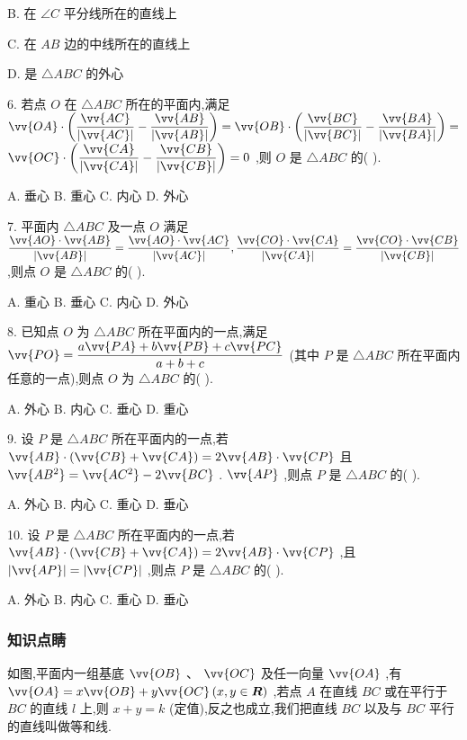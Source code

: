 B. 在 $\angle C$ 平分线所在的直线上

C. 在 ${AB}$ 边的中线所在的直线上

D. 是 $\bigtriangleup {ABC}$ 的外心

6. 若点 $O$ 在 $\bigtriangleup {ABC}$ 所在的平面内,满足 $\vv{OA} \cdot  \left( {\dfrac{\vv{AC}}{\left| \vv{AC}\right| } - \dfrac{\vv{AB}}{\left| \vv{AB}\right| }}\right)  = \vv{OB} \cdot  \left( {\dfrac{\vv{BC}}{\left| \vv{BC}\right| } - \dfrac{\vv{BA}}{\left| \vv{BA}\right| }}\right)  =$  $\vv{OC} \cdot  \left( {\dfrac{\vv{CA}}{\left| \vv{CA}\right| } - \dfrac{\vv{CB}}{\left| \vv{CB}\right| }}\right)  = 0$ ,则 $O$ 是 $\bigtriangleup  {ABC}$ 的(   ).

A. 垂心 B. 重心 C. 内心 D. 外心

7. 平面内 $\bigtriangleup {ABC}$ 及一点 $O$ 满足 $\dfrac{\vv{AO} \cdot  \vv{AB}}{\left| \vv{AB}\right| } = \dfrac{\vv{AO} \cdot  \vv{AC}}{\left| \vv{AC}\right| },\dfrac{\vv{CO} \cdot  \vv{CA}}{\left| \vv{CA}\right| } = \dfrac{\vv{CO} \cdot  \vv{CB}}{\left| \vv{CB}\right| }$ ,则点 $O$ 是 $\bigtriangleup {ABC}$ 的(   ).

A. 重心 B. 垂心 C. 内心 D. 外心

8. 已知点 $O$ 为 $\bigtriangleup {ABC}$ 所在平面内的一点,满足 $\vv{PO} = \dfrac{a\vv{PA} + b\vv{PB} + c\vv{PC}}{a + b + c}$ (其中 $P$ 是 $\bigtriangleup {ABC}$ 所在平面内任意的一点),则点 $O$ 为 $\bigtriangleup  {ABC}$ 的(   ).

A. 外心 B. 内心 C. 垂心 D. 重心

9. 设 $P$ 是 $\bigtriangleup {ABC}$ 所在平面内的一点,若 $\vv{AB} \cdot  \left( {\vv{CB} + \vv{CA}}\right)  = 2\vv{AB} \cdot  \vv{CP}$ 且 $\vv{A{B}^{2}} = \vv{A{C}^{2}} - 2\vv{BC}$ . $\vv{AP}$ ,则点 $P$ 是 $\bigtriangleup  {ABC}$ 的(   ).

A. 外心 B. 内心 C. 重心 D. 垂心

10. 设 $P$ 是 $\bigtriangleup {ABC}$ 所在平面内的一点,若 $\vv{AB} \cdot  \left( {\vv{CB} + \vv{CA}}\right)  = 2\vv{AB} \cdot  \vv{CP}$ ,且 $\left| \vv{AP}\right|  = \left| \vv{CP}\right|$ ,则点 $P$ 是 $\bigtriangleup  {ABC}$ 的(   ).

A. 外心 B. 内心 C. 重心 D. 垂心

\subsubsection*{知识点睛}

如图,平面内一组基底 $\vv{OB}$ 、 $\vv{OC}$ 及任一向量 $\vv{OA}$ ,有 $\vv{OA} = x\vv{OB} + y\vv{OC}\left( {x,y \in  \mathbf{R}}\right)$ ,若点 $A$ 在直线 ${BC}$ 或在平行于 ${BC}$ 的直线 $l$ 上,则 $x + y = k$ (定值),反之也成立,我们把直线 ${BC}$ 以及与 ${BC}$ 平行的直线叫做等和线.

